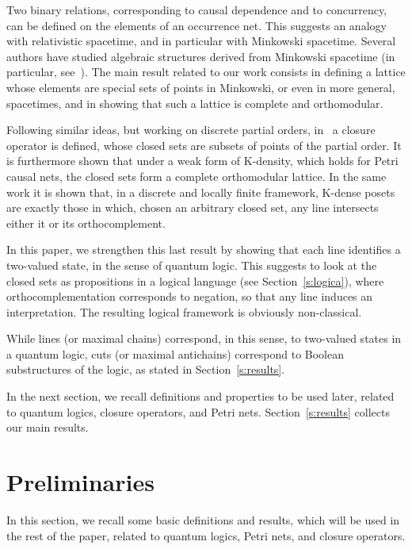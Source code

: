 \documentclass{eptcs}
\begin{document}
Two binary relations, corresponding to causal
dependence and to concurrency, can be defined on the elements
of an occurrence net. This suggests an analogy with relativistic
spacetime, and in particular with Minkowski spacetime. Several
authors have studied algebraic structures derived from Minkowski
spacetime (in particular, see~\cite{C02, CJ77}).
The main result related to our work consists in defining a lattice
whose elements are special sets of points in Minkowski, or even in
more general, spacetimes, and in showing that such a lattice is
complete and orthomodular.

Following similar ideas, but working on discrete partial orders,
in~\cite{BPR10} a closure operator is defined, whose closed sets
are subsets of points of the partial order. It is furthermore
shown that under a weak form of K-density, which holds for Petri
causal nets, the closed sets form a complete orthomodular lattice.
In the same work it is shown that, in a discrete and locally finite
framework, K-dense posets are exactly those in which, chosen an
arbitrary closed set, any line intersects either it or its
orthocomplement.

In this paper, we strengthen this last result by showing that
each line identifies a two-valued state, in the sense of quantum
logic. This suggests to look at the closed sets as propositions
in a logical language (see Section~\ref{s:logica}),
where orthocomplementation corresponds
to negation, so that any line induces an interpretation.
The resulting logical framework is obviously non-classical.

While lines (or maximal chains) correspond, in this sense, to
two-valued states in a quantum logic, cuts (or maximal antichains)
correspond to Boolean substructures of the logic, as stated in
Section~\ref{s:results}.

In the next section, we recall definitions and properties to
be used later, related to quantum logics, closure operators,
and Petri nets.
Section~\ref{s:results} collects our main results.
\section{Preliminaries}\label{s:preldef}
In this section, we recall some basic definitions and results,
which will be used in the rest of the paper, related to quantum logics,
Petri nets, and closure operators.
\end{document}
